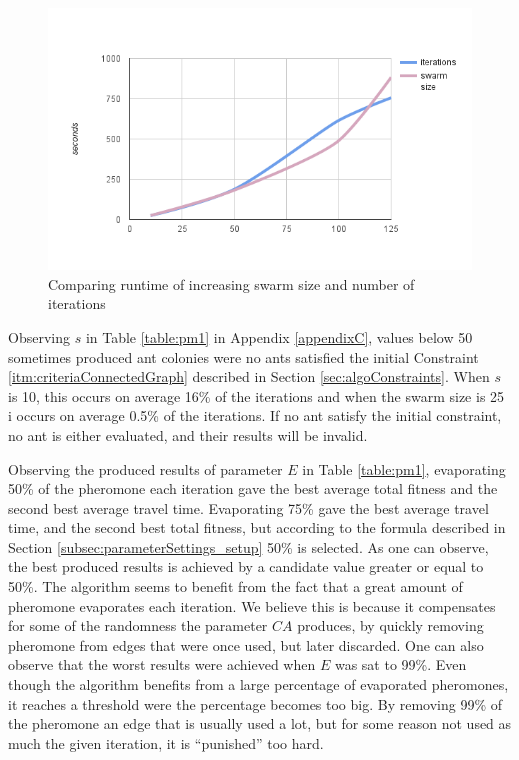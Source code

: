 
\begin{figure}[H]
\begin{center}
  \includegraphics[width=5in]{assets/iterations_swarmsize_runtime.png}
  \end{center}
  \caption{Comparing runtime of increasing swarm size and number of iterations}
  \label{fig:svsiruntime} 
\end{figure}


Observing $s$ in Table \vref{table:pm1} in Appendix \ref{appendixC}, values below 50 sometimes produced ant colonies were no ants satisfied the initial Constraint \ref{itm:criteriaConnectedGraph} described in Section \vref{sec:algoConstraints}. When $s$ is 10, this occurs on average 16\% of the iterations and when the swarm size is 25 i occurs on average 0.5\% of the iterations. If no ant satisfy the initial constraint, no ant is either evaluated, and their results will be invalid.

Observing the produced results of parameter $E$ in Table \vref{table:pm1}, evaporating 50\% of the pheromone each iteration gave the best average total fitness and the second best average travel time. Evaporating 75\% gave the best average travel time, and the second best total fitness, but according to the formula described in Section \vref{subsec:parameterSettings_setup} 50\% is selected. As one can observe, the best produced results is achieved by a candidate value greater or equal to 50\%. The algorithm seems to benefit from the fact that a great amount of pheromone evaporates each iteration. We believe this is because it compensates for some of the randomness the parameter $CA$ produces, by quickly removing pheromone from edges that were once used, but later discarded. One can also observe that the worst results were achieved when $E$ was sat to 99\%. Even though the algorithm benefits from a large percentage of evaporated pheromones, it reaches a threshold were the percentage becomes too big. By removing 99\% of the pheromone an edge that is usually used a lot, but for some reason not used as much the given iteration, it is ``punished'' too hard. 
\newline

